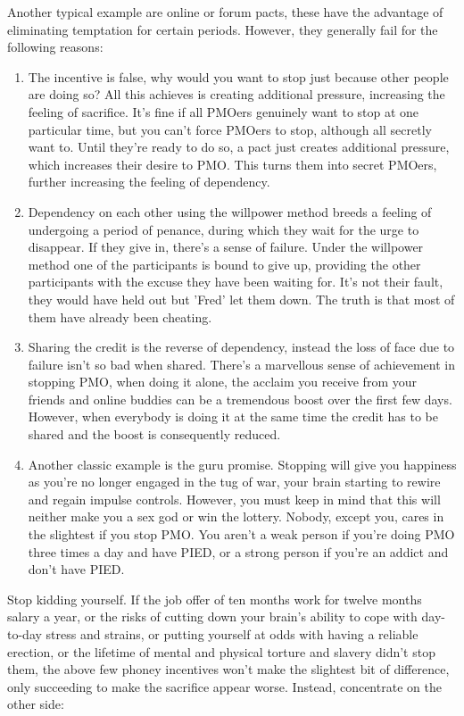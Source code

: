 \documentclass[easypeasy.tex]{subfiles}
\begin{document}
Another typical example are online or forum pacts, these have the advantage of eliminating temptation for certain periods. However, they generally fail for the following reasons:
\begin{enumerate}
  \item The incentive is false, why would you want to stop just because other people are doing so? All this achieves is creating additional pressure, increasing the feeling of sacrifice. It's fine if all PMOers genuinely want to stop at one particular time, but you can't force PMOers to stop, although all secretly want to. Until they're ready to do so, a pact just creates additional pressure, which increases their desire to PMO. This turns them into secret PMOers, further increasing the feeling of dependency.

  \item Dependency on each other using the willpower method breeds a feeling of undergoing a period of penance, during which they wait for the urge to disappear. If they give in, there's a sense of failure. Under the willpower method one of the participants is bound to give up, providing the other participants with the excuse they have been waiting for. It's not their fault, they would have held out but 'Fred' let them down. The truth is that most of them have already been cheating.

  \item Sharing the credit is the reverse of dependency, instead the loss of face due to failure isn't so bad when shared. There's a marvellous sense of achievement in stopping PMO, when doing it alone, the acclaim you receive from your friends and online buddies can be a tremendous boost over the first few days. However, when everybody is doing it at the same time the credit has to be shared and the boost is consequently reduced.

  \item Another classic example is the guru promise. Stopping will give you happiness as you're no longer engaged in the tug of war, your brain starting to rewire and regain impulse controls. However, you must keep in mind that this will neither make you a sex god or win the lottery. Nobody, except you, cares in the slightest if you stop PMO. You aren't a weak person if you're doing PMO three times a day and have PIED, or a strong person if you're an addict and don't have PIED.
\end{enumerate}
Stop kidding yourself. If the job offer of ten months work for twelve months salary a year, or the risks of cutting down your brain's ability to cope with day-to-day stress and strains, or putting yourself at odds with having a reliable erection, or the lifetime of mental and physical torture and slavery didn't stop them, the above few phoney incentives won't make the slightest bit of difference, only succeeding to make the sacrifice appear worse. Instead, concentrate on the other side:
  
\end{document}
